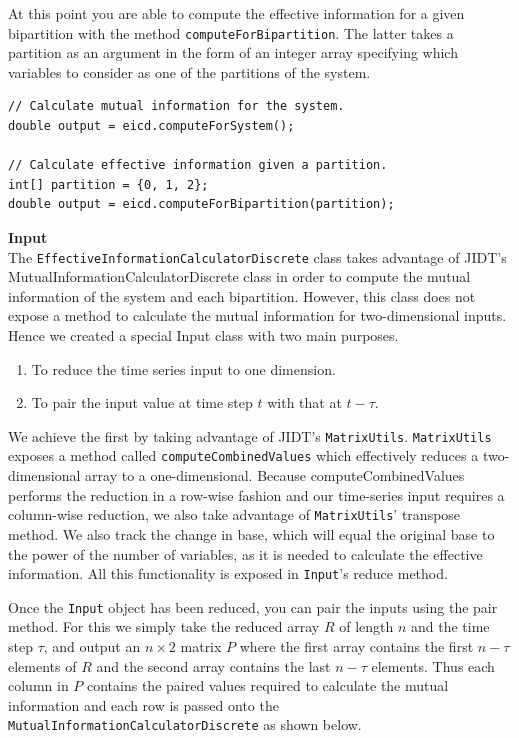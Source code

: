 \documentclass[a4paper,11pt]{article}
\begin{document}
At this point you are able to compute the effective information for a given bipartition with the method \texttt{computeForBipartition}. The latter takes a partition as an argument in the form of an integer array specifying which variables to consider as one of the partitions of the system.

\begin{verbatim}
// Calculate mutual information for the system.
double output = eicd.computeForSystem();

// Calculate effective information given a partition.
int[] partition = {0, 1, 2};
double output = eicd.computeForBipartition(partition);
\end{verbatim}


\noindent \textbf{Input}\\

\noindent The \texttt{EffectiveInformationCalculatorDiscrete} class takes advantage of JIDT's MutualInformationCalculatorDiscrete class in order to compute the mutual information of the system and each bipartition. However, this class does not expose a method to calculate the mutual information for two-dimensional inputs. Hence we created a special Input class with two main purposes.

\begin{enumerate}
\item{To reduce the time series input to one dimension.}
\item{To pair the input value at time step $t$ with that at $t-\tau$.}
\end{enumerate}

We achieve the first by taking advantage of JIDT's \texttt{MatrixUtils}. \texttt{MatrixUtils} exposes a method called \texttt{computeCombinedValues} which effectively reduces a two-dimensional array to a one-dimensional. Because computeCombinedValues performs the reduction in a row-wise fashion and our time-series input requires a column-wise reduction, we also take advantage of \texttt{MatrixUtils}' transpose method. We also track the change in base, which will equal the original base to the power of the number of variables, as it is needed to calculate the effective information. All this functionality is exposed in \texttt{Input}'s reduce method.

Once the \texttt{Input} object has been reduced, you can pair the inputs using the pair method. For this we simply take the reduced array $R$ of length $n$ and the time step $\tau$, and output an $n \times 2$ matrix $P$ where the first array contains the first $n - \tau$ elements of $R$ and the second array contains the last $n - \tau$ elements. Thus each column in $P$ contains the paired values required to calculate the mutual information and each row is passed onto the \texttt{MutualInformationCalculatorDiscrete} as shown below.
\end{document}
